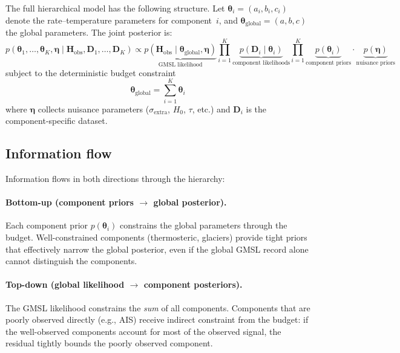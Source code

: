 \documentclass[11pt]{article}
\newcommand{\sigextra}{\sigma_{\text{extra}}}
\begin{document}
The full hierarchical model has the following structure.  Let $\boldsymbol{\theta}_i = (a_i, b_i, c_i)$ denote the rate--temperature parameters for component~$i$, and $\boldsymbol{\theta}_{\text{global}} = (a, b, c)$ the global parameters.  The joint posterior is:
\begin{equation}
  p(\boldsymbol{\theta}_1, \ldots, \boldsymbol{\theta}_K, \boldsymbol{\eta} \mid \mathbf{H}_{\text{obs}}, \mathbf{D}_1, \ldots, \mathbf{D}_K)
  \propto
  \underbrace{p(\mathbf{H}_{\text{obs}} \mid \boldsymbol{\theta}_{\text{global}}, \boldsymbol{\eta})}_{\text{GMSL likelihood}}
  \prod_{i=1}^{K} \underbrace{p(\mathbf{D}_i \mid \boldsymbol{\theta}_i)}_{\text{component likelihoods}}
  \prod_{i=1}^{K} \underbrace{p(\boldsymbol{\theta}_i)}_{\text{component priors}}
  \cdot \underbrace{p(\boldsymbol{\eta})}_{\text{nuisance priors}}
  \label{eq:joint-posterior}
\end{equation}
subject to the deterministic budget constraint
\begin{equation}
  \boldsymbol{\theta}_{\text{global}} = \sum_{i=1}^{K} \boldsymbol{\theta}_i
  \label{eq:budget-constraint}
\end{equation}
where $\boldsymbol{\eta}$ collects nuisance parameters ($\sigextra$, $H_0$, $\tau$, etc.) and $\mathbf{D}_i$ is the component-specific dataset.

\subsection{Information flow}

Information flows in both directions through the hierarchy:

\paragraph{Bottom-up (component priors $\to$ global posterior).}  Each component prior $p(\boldsymbol{\theta}_i)$ constrains the global parameters through the budget.  Well-constrained components (thermosteric, glaciers) provide tight priors that effectively narrow the global posterior, even if the global GMSL record alone cannot distinguish the components.

\paragraph{Top-down (global likelihood $\to$ component posteriors).}  The GMSL likelihood constrains the \emph{sum} of all components.  Components that are poorly observed directly (e.g., AIS) receive indirect constraint from the budget: if the well-observed components account for most of the observed signal, the residual tightly bounds the poorly observed component.
\end{document}
